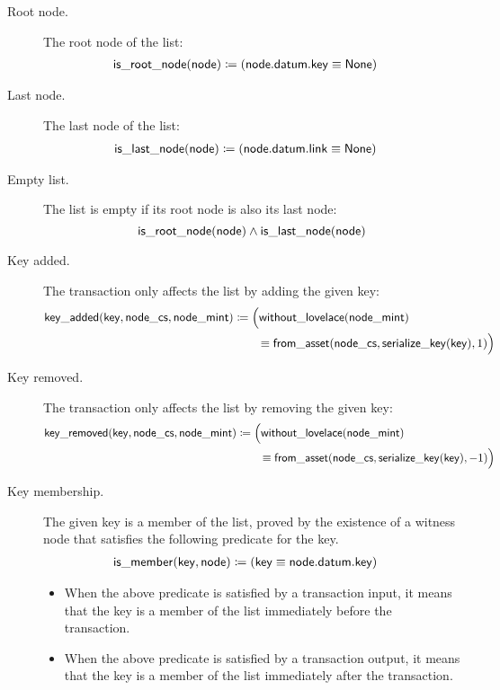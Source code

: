 \documentclass[../midgard.tex]{subfiles}
\begin{document}
\begin{description}
    \item[Root node.] The root node of the list:
        \begin{align*}
            \mathsf{is\_root\_node} (\mathsf{node}) &\coloneq
              ( \mathsf{node.datum.key} \equiv \mathsf{None} )
        \end{align*}
        
    \item[Last node.] The last node of the list:
        \begin{align*}
            \mathsf{is\_last\_node} (\mathsf{node}) &\coloneq
              ( \mathsf{node.datum.link} \equiv \mathsf{None} )
        \end{align*}

    \item[Empty list.] The list is empty if its root node is also its last node:
        \begin{equation*}
            \mathsf{is\_root\_node}(\mathsf{node}) \land
            \mathsf{is\_last\_node}(\mathsf{node})
        \end{equation*}
    
    \item[Key added.] The transaction only affects the list by adding the given key:
        \begin{align*}
            \mathsf{key\_added} (\mathsf{key}, \mathsf{node\_cs}, \mathsf{node\_mint}) &\coloneq
                \Bigl( \mathsf{without\_lovelace}(\mathsf{node\_mint}) \\ &\qquad\equiv
                  \mathsf{from\_asset}(\mathsf{node\_cs}, \mathsf{serialize\_key}(\mathsf{key}), 1)
                \Bigr)
        \end{align*}

    \item[Key removed.] The transaction only affects the list by removing the given key:
        \begin{align*}
            \mathsf{key\_removed} (\mathsf{key}, \mathsf{node\_cs}, \mathsf{node\_mint}) &\coloneq
                \Bigl( \mathsf{without\_lovelace}(\mathsf{node\_mint}) \\ &\qquad\equiv
                  \mathsf{from\_asset}(\mathsf{node\_cs}, \mathsf{serialize\_key}(\mathsf{key}), -1)
                \Bigr)
        \end{align*}
    
    \item[Key membership.] The given key is a member of the list, proved by the existence of a witness node that satisfies the following predicate for the key.
        \begin{align*}
            \mathsf{is\_member} (\mathsf{key}, \mathsf{node}) &\coloneq
              ( \mathsf{key} \equiv \mathsf{node.datum.key} )
        \end{align*}
        \begin{itemize}
            \item When the above predicate is satisfied by a transaction input, it means that the key is a member of the list immediately before the transaction.
            \item When the above predicate is satisfied by a transaction output, it means that the key is a member of the list immediately after the transaction.
        \end{itemize}


\end{description}
\end{document}
